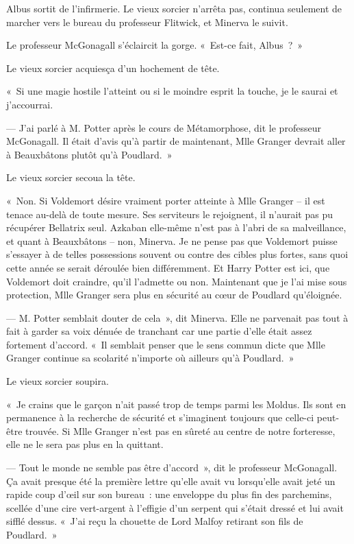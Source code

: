 Albus sortit de l'infirmerie. Le vieux sorcier n'arrêta pas, continua seulement de marcher vers le bureau du professeur Flitwick, et Minerva le suivit.

Le professeur McGonagall s'éclaircit la gorge. «~Est-ce fait, Albus~?~»

Le vieux sorcier acquiesça d'un hochement de tête.

«~Si une magie hostile l'atteint ou si le moindre esprit la touche, je le saurai et j'accourrai.

--- J'ai parlé à M. Potter après le cours de Métamorphose, dit le professeur McGonagall. Il était d'avis qu'à partir de maintenant, Mlle Granger devrait aller à Beauxbâtons plutôt qu'à Poudlard.~»

Le vieux sorcier secoua la tête.

«~Non. Si Voldemort désire vraiment porter atteinte à Mlle Granger -- il est tenace au-delà de toute mesure. Ses serviteurs le rejoignent, il n'aurait pas pu récupérer Bellatrix seul. Azkaban elle-même n'est pas à l'abri de sa malveillance, et quant à Beauxbâtons -- non, Minerva. Je ne pense pas que Voldemort puisse s'essayer à de telles possessions souvent ou contre des cibles plus fortes, sans quoi cette année se serait déroulée bien différemment. Et Harry Potter est ici, que Voldemort doit craindre, qu'il l'admette ou non. Maintenant que je l'ai mise sous protection, Mlle Granger sera plus en sécurité au cœur de Poudlard qu'éloignée.

--- M. Potter semblait douter de cela~», dit Minerva. Elle ne parvenait pas tout à fait à garder sa voix dénuée de tranchant car une partie d'elle était assez fortement d'accord. «~Il semblait penser que le sens commun dicte que Mlle Granger continue sa scolarité n'importe où ailleurs qu'à Poudlard.~»

Le vieux sorcier soupira.

«~Je crains que le garçon n'ait passé trop de temps parmi les Moldus. Ils sont en permanence à la recherche de sécurité et s'imaginent toujours que celle-ci peut-être trouvée. Si Mlle Granger n'est pas en sûreté au centre de notre forteresse, elle ne le sera pas plus en la quittant.

--- Tout le monde ne semble pas être d'accord~», dit le professeur McGonagall. Ça avait presque été la première lettre qu'elle avait vu lorsqu'elle avait jeté un rapide coup d'œil sur son bureau~: une enveloppe du plus fin des parchemins, scellée d'une cire vert-argent à l'effigie d'un serpent qui s'était dressé et lui avait sifflé dessus. «~J'ai reçu la chouette de Lord Malfoy retirant son fils de Poudlard.~»

